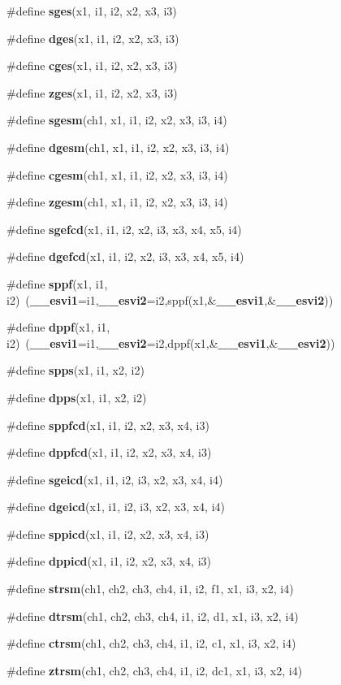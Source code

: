\begin{CompactItemize}
\item 
\#define {\bf sges}(x1, i1, i2, x2, x3, i3)
\item 
\#define {\bf dges}(x1, i1, i2, x2, x3, i3)
\item 
\#define {\bf cges}(x1, i1, i2, x2, x3, i3)
\item 
\#define {\bf zges}(x1, i1, i2, x2, x3, i3)
\item 
\#define {\bf sgesm}(ch1, x1, i1, i2, x2, x3, i3, i4)
\item 
\#define {\bf dgesm}(ch1, x1, i1, i2, x2, x3, i3, i4)
\item 
\#define {\bf cgesm}(ch1, x1, i1, i2, x2, x3, i3, i4)
\item 
\#define {\bf zgesm}(ch1, x1, i1, i2, x2, x3, i3, i4)
\item 
\#define {\bf sgefcd}(x1, i1, i2, x2, i3, x3, x4, x5, i4)
\item 
\#define {\bf dgefcd}(x1, i1, i2, x2, i3, x3, x4, x5, i4)
\item 
\#define {\bf sppf}(x1, i1, i2)~({\bf \_\-\_\-esvi1}=i1,{\bf \_\-\_\-esvi2}=i2,sppf(x1,\&{\bf \_\-\_\-esvi1},\&{\bf \_\-\_\-esvi2}))
\item 
\#define {\bf dppf}(x1, i1, i2)~({\bf \_\-\_\-esvi1}=i1,{\bf \_\-\_\-esvi2}=i2,dppf(x1,\&{\bf \_\-\_\-esvi1},\&{\bf \_\-\_\-esvi2}))
\item 
\#define {\bf spps}(x1, i1, x2, i2)
\item 
\#define {\bf dpps}(x1, i1, x2, i2)
\item 
\#define {\bf sppfcd}(x1, i1, i2, x2, x3, x4, i3)
\item 
\#define {\bf dppfcd}(x1, i1, i2, x2, x3, x4, i3)
\item 
\#define {\bf sgeicd}(x1, i1, i2, i3, x2, x3, x4, i4)
\item 
\#define {\bf dgeicd}(x1, i1, i2, i3, x2, x3, x4, i4)
\item 
\#define {\bf sppicd}(x1, i1, i2, x2, x3, x4, i3)
\item 
\#define {\bf dppicd}(x1, i1, i2, x2, x3, x4, i3)
\item 
\#define {\bf strsm}(ch1, ch2, ch3, ch4, i1, i2, f1, x1, i3, x2, i4)
\item 
\#define {\bf dtrsm}(ch1, ch2, ch3, ch4, i1, i2, d1, x1, i3, x2, i4)
\item 
\#define {\bf ctrsm}(ch1, ch2, ch3, ch4, i1, i2, c1, x1, i3, x2, i4)
\item 
\#define {\bf ztrsm}(ch1, ch2, ch3, ch4, i1, i2, dc1, x1, i3, x2, i4)
\item 

\end{CompactItemize}
